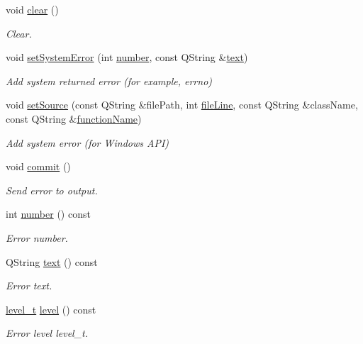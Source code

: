\begin{DoxyCompactItemize}
void \hyperlink{classmdt_error_a9fa7eb879fe7b26c4a4f0bd55fe29ffa}{clear} ()
\begin{DoxyCompactList}\small\item\em Clear. \end{DoxyCompactList}\item 
void \hyperlink{classmdt_error_a49254fdb566fee1a4adafe6a3694befc}{set\-System\-Error} (int \hyperlink{classmdt_error_ad233adb8efe4180b85f584c5afdd49fc}{number}, const Q\-String \&\hyperlink{classmdt_error_a8630bb6b21b70edfe3d13eaff82a1baf}{text})
\begin{DoxyCompactList}\small\item\em Add system returned error (for example, errno) \end{DoxyCompactList}\item 
void \hyperlink{classmdt_error_a8dd3203e11b308e6c2701d7f075af885}{set\-Source} (const Q\-String \&file\-Path, int \hyperlink{classmdt_error_a7f5a9ac5e896ba24009bcadddcfe79cb}{file\-Line}, const Q\-String \&class\-Name, const Q\-String \&\hyperlink{classmdt_error_abff9bc71ff554f6f6189be88b0afa731}{function\-Name})
\begin{DoxyCompactList}\small\item\em Add system error (for Windows A\-P\-I) \end{DoxyCompactList}\item 
void \hyperlink{classmdt_error_ad3cccf7c7f7d4bdabdcb4e60794bb9cb}{commit} ()
\begin{DoxyCompactList}\small\item\em Send error to output. \end{DoxyCompactList}\item 
int \hyperlink{classmdt_error_ad233adb8efe4180b85f584c5afdd49fc}{number} () const 
\begin{DoxyCompactList}\small\item\em Error number. \end{DoxyCompactList}\item 
Q\-String \hyperlink{classmdt_error_a8630bb6b21b70edfe3d13eaff82a1baf}{text} () const 
\begin{DoxyCompactList}\small\item\em Error text. \end{DoxyCompactList}\item 
\hyperlink{classmdt_error_a5c8b1a040e2feaa848f6201d6b6f0cd7}{level\-\_\-t} \hyperlink{classmdt_error_a8d8382d3008de890689df415deb7766e}{level} () const 
\begin{DoxyCompactList}\small\item\em Error level  level\-\_\-t. \end{DoxyCompactList}\item 

\end{DoxyCompactItemize}
